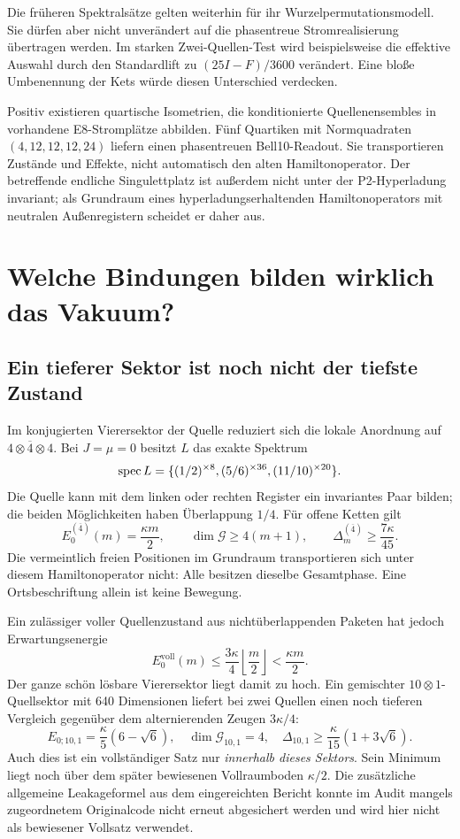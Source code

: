 Die früheren Spektralsätze gelten weiterhin für ihr Wurzelpermutationsmodell. Sie dürfen aber nicht unverändert auf die phasentreue Stromrealisierung übertragen werden. Im starken Zwei-Quellen-Test wird beispielsweise die effektive Auswahl durch den Standardlift zu $(25I-F)/3600$ verändert. Eine bloße Umbenennung der Kets würde diesen Unterschied verdecken. 

Positiv existieren quartische Isometrien, die konditionierte Quellenensembles in vorhandene E8-Stromplätze abbilden. Fünf Quartiken mit Normquadraten $(4,12,12,12,24)$ liefern einen phasentreuen Bell10-Readout. Sie transportieren Zustände und Effekte, nicht automatisch den alten Hamiltonoperator. Der betreffende endliche Singulettplatz ist außerdem nicht unter der P2-Hyperladung invariant; als Grundraum eines hyperladungserhaltenden Hamiltonoperators mit neutralen Außenregistern scheidet er daher aus. 

\chapter{Welche Bindungen bilden wirklich das Vakuum?}
\section{Ein tieferer Sektor ist noch nicht der tiefste Zustand}
Im konjugierten Vierersektor der Quelle reduziert sich die lokale Anordnung auf $4\otimes\overline4\otimes4$. Bei $J=\mu=0$ besitzt $L$ das exakte Spektrum
\[
 \operatorname{spec} L=\{(1/2)^{\times8},(5/6)^{\times36},(11/10)^{\times20}\}.
\]
Die Quelle kann mit dem linken oder rechten Register ein invariantes Paar bilden; die beiden Möglichkeiten haben Überlappung $1/4$. Für offene Ketten gilt
\[
 E_0^{(\overline4)}(m)=\frac{\kappa m}2,\qquad
 \dim\mathcal G\ge4(m+1),\qquad
 \Delta_m^{(\overline4)}\ge\frac{7\kappa}{45}.
\]
Die vermeintlich freien Positionen im Grundraum transportieren sich unter diesem Hamiltonoperator nicht: Alle besitzen dieselbe Gesamtphase. Eine Ortsbeschriftung allein ist keine Bewegung. 

Ein zulässiger voller Quellenzustand aus nichtüberlappenden Paketen hat jedoch Erwartungsenergie
\[
 E_0^{\mathrm{voll}}(m)\le\frac{3\kappa}{4}\left\lfloor\frac m2\right\rfloor
 <\frac{\kappa m}2.
\]
Der ganze schön lösbare Vierersektor liegt damit zu hoch. Ein gemischter $10\otimes1$-Quellsektor mit 640 Dimensionen liefert bei zwei Quellen einen noch tieferen Vergleich gegenüber dem alternierenden Zeugen $3\kappa/4$:
\[
 E_{0;10,1}=\frac\kappa5(6-\sqrt6),\quad
 \dim\mathcal G_{10,1}=4,\quad
 \Delta_{10,1}\ge\frac\kappa{15}(1+3\sqrt6).
\]
Auch dies ist ein vollständiger Satz nur \emph{innerhalb dieses Sektors}. Sein Minimum liegt noch über dem später bewiesenen Vollraumboden $\kappa/2$. Die zusätzliche allgemeine Leakageformel aus dem eingereichten Bericht konnte im Audit mangels zugeordnetem Originalcode nicht erneut abgesichert werden und wird hier nicht als bewiesener Vollsatz verwendet. 

